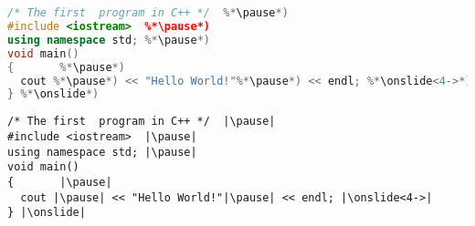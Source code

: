 \documentclass[aspectratio=1610, english]{beamer} %
\begin{document}
\section{}
\subsection*{}
\begin{frame}[fragile]{}
	\begin{lstlisting}[language=C++]
/* The first  program in C++ */  %*\pause*)
#include <iostream>  %*\pause*)
using namespace std; %*\pause*)
void main() 
{       %*\pause*)
  cout %*\pause*) << "Hello World!"%*\pause*) << endl; %*\onslide<4->*)
} %*\onslide*)
\end{lstlisting}
\end{frame}
\begin{frame}[fragile]{}
	\begin{verbatim}
/* The first  program in C++ */  |\pause|
#include <iostream>  |\pause|
using namespace std; |\pause|
void main() 
{       |\pause|
  cout |\pause| << "Hello World!"|\pause| << endl; |\onslide<4->|
} |\onslide|
	\end{verbatim}
\end{frame}
\appendix
\end{document}
